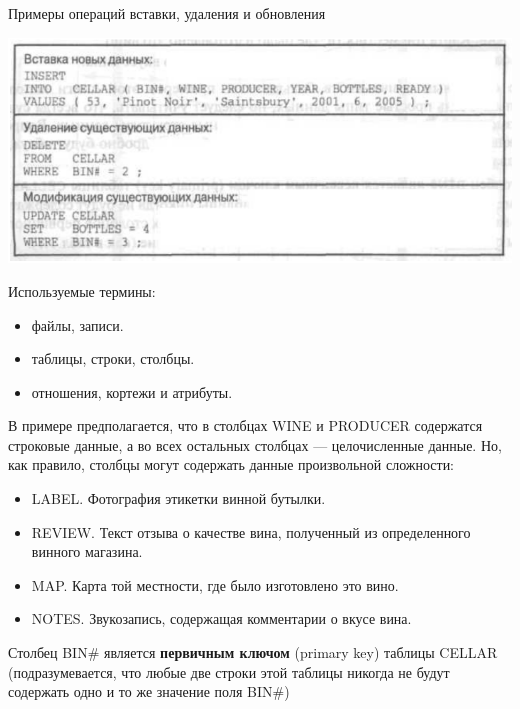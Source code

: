\documentclass{beamer}
\begin{document}
\begin{frame}
\begin{block}{Примеры операций вставки, удаления и обновления}
\begin{center}
\includegraphics[scale=0.5]{images/example-03.png}
\end{center}
\end{block}
Используемые термины:
\begin{itemize}
\item файлы, записи.
\item таблицы, строки, столбцы.
\item отношения, кортежи и атрибуты.
\end{itemize}
\end{frame}

\begin{frame}
В примере предполагается, что в столбцах WINE и PRODUCER содержатся строковые данные, а во всех остальных столбцах — целочисленные данные. Но, как правило, столбцы могут содержать
данные произвольной сложности:
\begin{itemize}
\item LABEL. Фотография этикетки винной бутылки.
\item REVIEW. Текст отзыва о качестве вина, полученный из определенного винного
магазина.
\item MAP. Карта той местности, где было изготовлено это вино.
\item NOTES. Звукозапись, содержащая комментарии о вкусе вина.
\end{itemize}
Столбец BIN\# является \textbf{первичным ключом} (primary key) таблицы CELLAR (подразумевается, что любые две строки этой таблицы никогда не будут содержать одно и то же значение поля BIN\#)
\end{frame}
\end{document}
